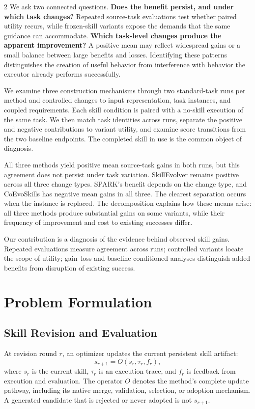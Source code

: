 \documentclass[10pt,letterpaper]{article}
\begin{document}
\begin{multicols}{2}
We ask two connected questions. \textbf{Does the benefit persist, and under which task changes?} Repeated source-task evaluations test whether paired utility recurs, while frozen-skill variants expose the demands that the same guidance can accommodate. \textbf{Which task-level changes produce the apparent improvement?} A positive mean may reflect widespread gains or a small balance between large benefits and losses. Identifying these patterns distinguishes the creation of useful behavior from interference with behavior the executor already performs successfully.

We examine three construction mechanisms through two standard-task runs per method and controlled changes to input representation, task instances, and coupled requirements. Each skill condition is paired with a no-skill execution of the same task. We then match task identities across runs, separate the positive and negative contributions to variant utility, and examine score transitions from the two baseline endpoints. The completed skill in use is the common object of diagnosis.

All three methods yield positive mean source-task gains in both runs, but this agreement does not persist under task variation. SkillEvolver remains positive across all three change types. SPARK's benefit depends on the change type, and CoEvoSkills has negative mean gains in all three. The clearest separation occurs when the instance is replaced. The decomposition explains how these means arise: all three methods produce substantial gains on some variants, while their frequency of improvement and cost to existing successes differ.

Our contribution is a diagnosis of the evidence behind observed skill gains. Repeated evaluations measure agreement across runs; controlled variants locate the scope of utility; gain--loss and baseline-conditioned analyses distinguish added benefits from disruption of existing success.

\section{Problem Formulation}

\subsection{Skill Revision and Evaluation}

At revision round $r$, an optimizer updates the current persistent skill artifact:
\begin{equation}
s_{r+1}=O(s_r,\tau_r,f_r),
\end{equation}
where $s_r$ is the current skill, $\tau_r$ is an execution trace, and $f_r$ is feedback from execution and evaluation. The operator $O$ denotes the method's complete update pathway, including its native merge, validation, selection, or adoption mechanism. A generated candidate that is rejected or never adopted is not $s_{r+1}$.


\end{multicols}
\end{document}
